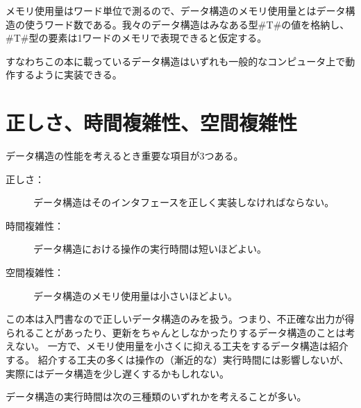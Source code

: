メモリ使用量はワード単位で測るので、データ構造のメモリ使用量とはデータ構造の使うワード数である。我々のデータ構造はみなある型#T#の値を格納し、#T#型の要素は1ワードのメモリで表現できると仮定する。

すなわちこの本に載っているデータ構造はいずれも一般的なコンピュータ上で動作するように実装できる。

\section{正しさ、時間複雑性、空間複雑性}

データ構造の性能を考えるとき重要な項目が3つある。
\begin{description}
  \item[正しさ：]データ構造はそのインタフェースを正しく実装しなければならない。
  \item[時間複雑性：]データ構造における操作の実行時間は短いほどよい。
  \item[空間複雑性：]データ構造のメモリ使用量は小さいほどよい。
\end{description}

この本は入門書なので正しいデータ構造のみを扱う。つまり、不正確な出力が得られることがあったり、更新をちゃんとしなかったりするデータ構造のことは考えない。
一方で、メモリ使用量を小さくに抑える工夫をするデータ構造は紹介する。
紹介する工夫の多くは操作の（漸近的な）実行時間には影響しないが、実際にはデータ構造を少し遅くするかもしれない。

データ構造の実行時間は次の三種類のいずれかを考えることが多い。

